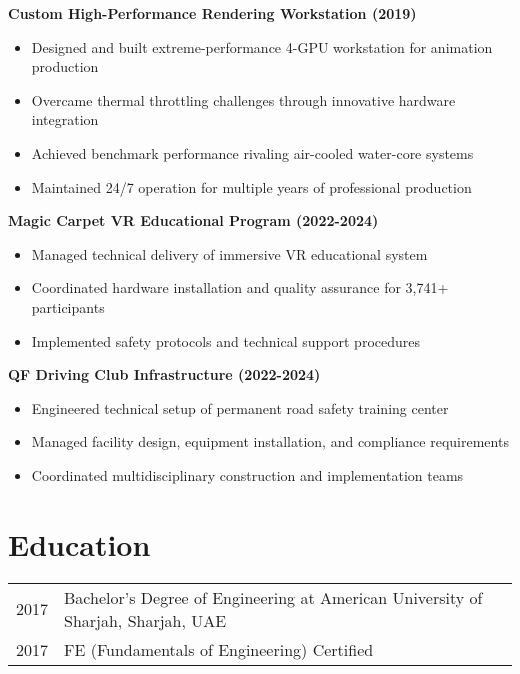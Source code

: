\documentclass[a4paper,12pt]{article}
\begin{document}
\textbf{Custom High-Performance Rendering Workstation (2019)}
\begin{itemize}[nosep,after=\strut, leftmargin=1.3em, itemsep=2pt,label=--]
\item Designed and built extreme-performance 4-GPU workstation for animation production
\item Overcame thermal throttling challenges through innovative hardware integration
\item Achieved benchmark performance rivaling air-cooled water-core systems
\item Maintained 24/7 operation for multiple years of professional production
\end{itemize}

\textbf{Magic Carpet VR Educational Program (2022-2024)}
\begin{itemize}[nosep,after=\strut, leftmargin=1em, itemsep=2pt,label=--]
\item Managed technical delivery of immersive VR educational system
\item Coordinated hardware installation and quality assurance for 3,741+ participants
\item Implemented safety protocols and technical support procedures
\end{itemize}

\pagebreak

\textbf{QF Driving Club Infrastructure (2022-2024)}
\begin{itemize}[nosep,after=\strut, leftmargin=1em, itemsep=2pt,label=--]
\item Engineered technical setup of permanent road safety training center
\item Managed facility design, equipment installation, and compliance requirements
\item Coordinated multidisciplinary construction and implementation teams
\end{itemize}

\section{Education}
\begin{tabularx}{\linewidth}{@{}l X@{}}
2017 & Bachelor's Degree of Engineering at American University of Sharjah, Sharjah, UAE \\
2017 & FE (Fundamentals of Engineering) Certified \\
\end{tabularx}
\end{document}
